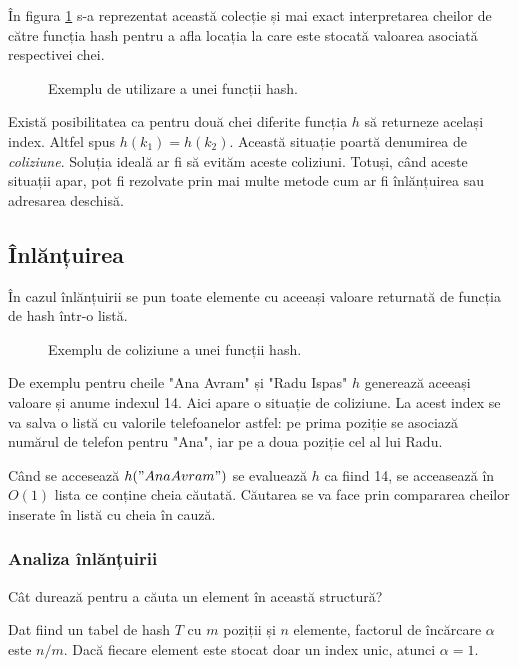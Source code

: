 În figura \ref{fig:hashfunction} s-a reprezentat această colecție și mai exact interpretarea cheilor de către funcția hash pentru a afla locația la care este stocată valoarea asociată respectivei chei.

\begin{figure}[H] 
	\centering	
	{
	}
	\caption{Exemplu de utilizare a unei funcții hash.} 
	\label{fig:hashfunction}
\end{figure}

Există posibilitatea ca pentru două chei diferite funcția $h$ să returneze același index. Altfel spus $h(k_{1})=h(k_{2})$. Această situație poartă denumirea de \textit{coliziune}. Soluția ideală ar fi să evităm aceste coliziuni. Totuși, când aceste situații apar, pot fi rezolvate prin mai multe metode cum ar fi înlănțuirea sau adresarea deschisă.

\subsection{Înlănțuirea}

În cazul înlănțuirii se pun toate elemente cu aceeași valoare returnată de funcția de hash într-o listă. 

\begin{figure}[H] 
	\centering	
	{
	}
	\caption{Exemplu de coliziune a unei funcții hash.} 
	\label{fig:hashcolision}
\end{figure}

De exemplu pentru cheile "Ana Avram" și "Radu Ispas" $h$ generează aceeași valoare și anume indexul 14. Aici apare o situație de coliziune.
La acest index se va salva o listă cu valorile telefoanelor astfel: pe prima poziție se asociază numărul de telefon pentru "Ana", iar pe a doua poziție cel al lui Radu.

Când se accesează $h("Ana Avram")$ se evaluează $h$ ca fiind 14, se acceasează în $O(1)$ lista ce conține cheia căutată. Căutarea se va face prin compararea cheilor inserate în listă cu cheia în cauză. 

\subsubsection{Analiza înlănțuirii}

Cât durează pentru a căuta un element în această structură?

Dat fiind un tabel de hash $T$ cu $m$ poziții și $n$ elemente, factorul de încărcare $\alpha$ este $n/m$. Dacă fiecare element este stocat doar un index unic, atunci $\alpha=1$.

